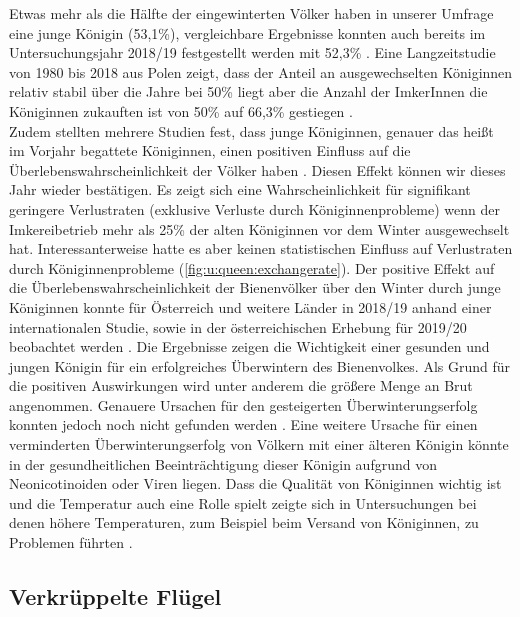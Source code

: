 Etwas mehr als die Hälfte der eingewinterten Völker haben in unserer Umfrage eine junge Königin (53,1\%), vergleichbare Ergebnisse konnten auch bereits im Untersuchungsjahr 2018/19 festgestellt werden mit 52,3\% \citep{oberreiter2020}. Eine Langzeitstudie von 1980 bis 2018 aus Polen zeigt, dass der Anteil an ausgewechselten Königinnen relativ stabil über die Jahre bei 50\% liegt aber die Anzahl der ImkerInnen die Königinnen zukauften ist von 50\% auf 66,3\% gestiegen \citep{bienkowska2020}. \\
Zudem stellten mehrere Studien fest, dass junge Königinnen, genauer das heißt im Vorjahr begattete Königinnen, einen positiven Einfluss auf die Überlebenswahrscheinlichkeit der Völker haben \citep{vanderzee2014, genersch2010, giacobino2016, morawetz2019}. Diesen Effekt können wir dieses Jahr wieder bestätigen. Es zeigt sich eine Wahrscheinlichkeit für signifikant geringere Verlustraten (exklusive Verluste durch Königinnenprobleme) wenn der Imkereibetrieb mehr als 25\% der alten Königinnen vor dem Winter ausgewechselt hat. Interessanterweise hatte es aber keinen statistischen Einfluss auf Verlustraten durch Königinnenprobleme (\cref{fig:u:queen:exchangerate}). Der positive Effekt auf die Überlebenswahrscheinlichkeit der Bienenvölker über den Winter durch junge Königinnen konnte für Österreich und weitere Länder in 2018/19 anhand einer internationalen Studie, sowie in der österreichischen Erhebung für 2019/20 beobachtet werden \citep{oberreiter2020, gray2020}. 
\newline
Die Ergebnisse zeigen die Wichtigkeit einer gesunden und jungen Königin für ein erfolgreiches Überwintern des Bienenvolkes. Als Grund für die positiven Auswirkungen wird unter anderem die größere Menge an Brut angenommen. Genauere Ursachen für den gesteigerten Überwinterungserfolg konnten jedoch noch nicht gefunden werden \citep{genersch2010, amiri2017, ricigliano2018}. Eine weitere Ursache für einen verminderten Überwinterungserfolg von Völkern mit einer älteren Königin könnte in der gesundheitlichen Beeinträchtigung dieser Königin aufgrund von Neonicotinoiden \citep{williams2015} oder Viren \citep{amiri2020a} liegen. Dass die Qualität von Königinnen wichtig ist und die Temperatur auch eine Rolle spielt zeigte sich in Untersuchungen bei denen höhere Temperaturen, zum Beispiel beim Versand von Königinnen, zu Problemen führten \citep{withrow2019, rousseau2020}.

\subsection{Verkrüppelte Flügel}

